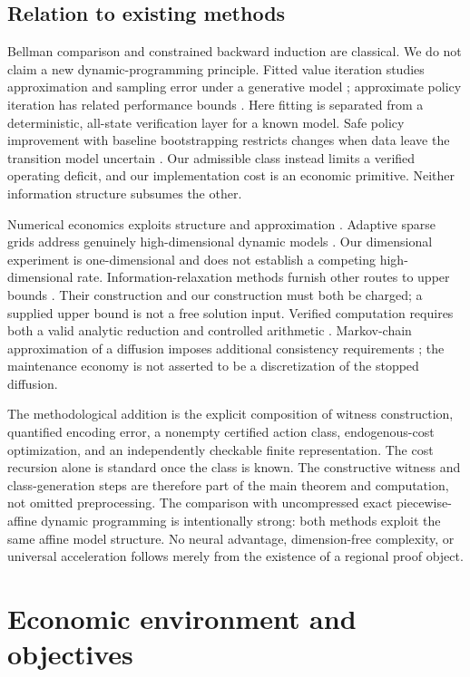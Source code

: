 \subsection{Relation to existing methods}
Bellman comparison and constrained backward induction are classical. We do not claim a new dynamic-programming principle. Fitted value iteration studies approximation and sampling error under a generative model \citep{MunosSzepesvari2008}; approximate policy iteration has related performance bounds \citep{Scherrer2013}. Here fitting is separated from a deterministic, all-state verification layer for a known model. Safe policy improvement with baseline bootstrapping restricts changes when data leave the transition model uncertain \citep{Laroche2019}. Our admissible class instead limits a verified operating deficit, and our implementation cost is an economic primitive. Neither information structure subsumes the other.

Numerical economics exploits structure and approximation \citep{Judd1998}. Adaptive sparse grids address genuinely high-dimensional dynamic models \citep{BrummScheidegger2017}. Our dimensional experiment is one-dimensional and does not establish a competing high-dimensional rate. Information-relaxation methods furnish other routes to upper bounds \citep{BrownSmithSun2010,BrownSmith2014}. Their construction and our construction must both be charged; a supplied upper bound is not a free solution input. Verified computation requires both a valid analytic reduction and controlled arithmetic \citep{Rump2010}. Markov-chain approximation of a diffusion imposes additional consistency requirements \citep{KushnerDupuis2001}; the maintenance economy is not asserted to be a discretization of the stopped diffusion.

The methodological addition is the explicit composition of witness construction, quantified encoding error, a nonempty certified action class, endogenous-cost optimization, and an independently checkable finite representation. The cost recursion alone is standard once the class is known. The constructive witness and class-generation steps are therefore part of the main theorem and computation, not omitted preprocessing. The comparison with uncompressed exact piecewise-affine dynamic programming is intentionally strong: both methods exploit the same affine model structure. No neural advantage, dimension-free complexity, or universal acceleration follows merely from the existence of a regional proof object.

\section{Economic environment and objectives}\label{sec:model}
